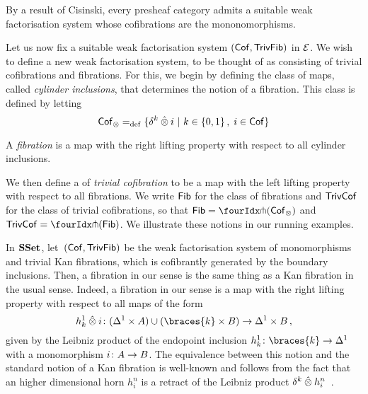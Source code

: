 \documentclass[reqno,10pt,a4paper,oneside,draft]{amsart}
\begin{document}
\begin{example} \label{thm:generation-presheaf-cisinski} By a result of Cisinski, every presheaf category admits a suitable weak factorisation
system whose cofibrations are the mononomorphisms. 
\end{example} 


Let us now fix a suitable weak factorisation system $(\mathsf{Cof},\mathsf{TrivFib})$ in $\mathcal{E}$.
We wish to define a new weak factorisation system, to be thought of as consisting of trivial cofibrations and fibrations. For this, we begin by defining the class of maps, called \emph{cylinder inclusions}, that determines the notion of a fibration. This class is defined by letting
\begin{equation}
\label{equ:cylinc}
\mathsf{Cof}_\otimes =_{\operatorname{def}} \{ \delta^k \mathbin{\hat{\otimes}} i \ | \ k \in \{ 0, 1 \} \, , \; i \in \mathsf{Cof} \}
\end{equation}

\begin{definition} \label{non-alg-fib} A \emph{fibration} is a map with the right lifting property with respect to all cylinder inclusions.
\end{definition} 


We then define a of \emph{trivial cofibration} to be a map with the left lifting property with respect to all fibrations.
We write $\mathsf{Fib}$ for the class of fibrations and $\mathsf{TrivCof}$ for the class of trivial cofibrations, so that 
$\Fib = \liftr{(\Cof_\otimes)}$ and $\TrivCof = \liftl{(\Fib)}$.  We illustrate these notions in our running examples.

\begin{example} \label{thm:fib-is-kan}
In $\mathbf{SSet}$, let~$(\mathsf{Cof}, \mathsf{TrivFib})$  be the weak factorisation system of monomorphisms and trivial Kan fibrations, which is cofibrantly generated
by the boundary inclusions. Then, a fibration in our sense  is the same thing as a Kan fibration in the usual sense. 
Indeed, a fibration in our sense is a map with the right lifting property with respect to all maps of the form
\[
h_k^1 \hatotimes i \co   (\Delta^1 \times A) \cup (\braces{k} \times B) \to  \Delta^1 \times B \, ,
\]
given by the Leibniz product of the endopoint inclusion $h_k^1 \co \braces{k} \to \Delta^1$ with a monomorphism $i \colon A \to B$. The equivalence between this notion and the standard notion of a Kan fibration is well-known and follows from the fact that an higher dimensional horn $h_i^n$ is a retract of the Leibniz product $\delta^k \mathbin{\hat{\otimes}} h_i^n$~\cite[Chap.~IV, Sec.~2]{gabriel-zisman:calculus-of-fractions}.
\end{example}
\end{document}
